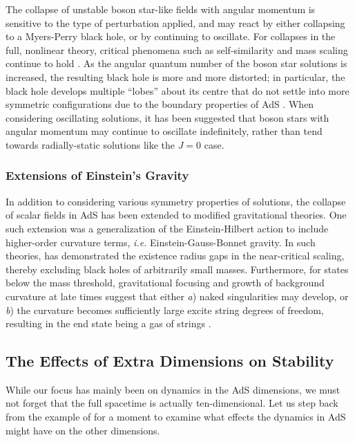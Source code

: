 \documentclass[../PhD.tex]{subfiles}
\begin{document}
The collapse of unstable boson star-like fields with angular momentum is sensitive to the type of perturbation applied, and may react by either collapsing to a Myers-Perry black hole, or by continuing to oscillate. For collapses in the full, nonlinear theory, critical phenomena such as self-similarity and mass scaling continue to hold \cite{gr-qc/0410040}. As the angular quantum number of the boson star solutions is increased, the resulting black hole is more and more distorted; in particular, the black hole develops multiple ``lobes'' about its centre that do not settle into more symmetric configurations due to the boundary properties of AdS \cite{1202.5809}. When considering oscillating solutions, it has been suggested that boson stars with angular momentum may continue to oscillate indefinitely, rather than tend towards radially-static solutions like the $J = 0$ case.

\subsubsection{Extensions of Einstein's Gravity}

In addition to considering various symmetry properties of solutions, the collapse of scalar fields in AdS has been extended to modified gravitational theories. One such extension was a generalization of the Einstein-Hilbert action to include higher-order curvature terms, {\it i.e.} Einstein-Gauss-Bonnet gravity. In such theories, \cite{1410.1869} has demonstrated the existence radius gaps in the near-critical scaling, thereby excluding black holes of arbitrarily small masses. Furthermore, for states below the mass threshold, gravitational focusing and growth of background curvature at late times suggest that either \emph{a}) naked singularities may develop, or \emph{b}) the curvature becomes sufficiently large excite string degrees of freedom, resulting in the end state being a gas of strings \cite{1608.05402}.


\subsection{The Effects of Extra Dimensions on Stability}
\label{sub: extra dims on stability}

While our focus has mainly been on dynamics in the AdS dimensions, we must not forget that the full spacetime is actually ten-dimensional. Let us step back from the example of \ads for a moment to examine what effects the dynamics in AdS might have on the other dimensions.
\end{document}
